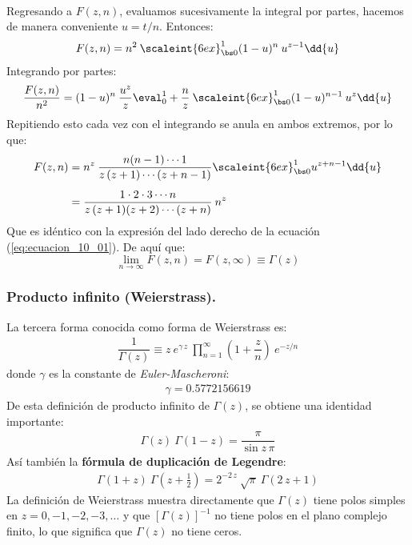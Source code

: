 \\
Regresando a $F(z,n)$, evaluamos sucesivamente la integral por partes, hacemos de manera conveniente $u = t/n$. Entonces:
\begin{align}
F(z,n) = n^{2} \: \scaleint{6ex}_{\bs 0}^{1} (1-u)^{n} \: u^{z-1} \dd{u}
\label{eq:ecuacion_10_12}
\end{align}
Integrando por partes:
\begin{align}
\dfrac{F(z, n)}{n^{2}} =  (1-u)^{n} \: \dfrac{u^{z}}{z} \eval_{0}^{1} + \dfrac{n}{z} \: \scaleint{6ex}_{\bs 0}^{1} (1-u)^{n-1} \: u^{z} \dd{u}
\label{eq:ecuacion_10_13}
\end{align}
Repitiendo esto cada vez con el integrando se anula en ambos extremos, por lo que:
\begin{align}
\begin{aligned}[b]
F(z,n) &= n^{z} \: \dfrac{n(n-1) \cdots 1}{z \, (z+1) \cdots (z+n-1)} \scaleint{6ex}_{\bs 0}^{1} u^{z+n-1} \dd{u} \\[0.5em]
&= \dfrac{1 \cdot 2 \cdot 3 \cdots n}{z \, (z+1)(z+2) \cdots (z+n)} \: n^{z}
\label{eq:ecuacion_10_14}
\end{aligned}
\end{align}
Que es idéntico con la expresión del lado derecho de la ecuación (\ref{eq:ecuacion_10_01}). De aquí que:
\begin{equation}
\lim_{n \to \infty} F(z, n) = F(z, \infty) \equiv \Gamma (z)
\label{eq:ecuacion_10_15}
\end{equation}

\subsubsection{Producto infinito (Weierstrass).}

La tercera forma conocida como forma de Weierstrass es:
\begin{align}
\dfrac{1}{\Gamma (z)} \equiv z \:  e^{\gamma \, z} \: \prod_{n=1}^{\infty} \left( 1 + \dfrac{z}{n} \right) \: e^{-z/n}
\label{eq:ecuacion_10_16}
\end{align}
donde $\gamma$ es la constante de \emph{Euler-Mascheroni}:
\begin{align}
\gamma = 0.5772156619
\label{eq:ecuacion_10_17}
\end{align}
De esta definición de producto infinito de $\Gamma (z)$, se obtiene una identidad importante:
\begin{align}
\Gamma (z) \: \Gamma (1 - z) = \dfrac{\pi}{\sin z \, \pi}
\label{eq:ecuacion_10_23}
\end{align}
Así también la \textbf{fórmula de duplicación de Legendre}:
\begin{align}
\Gamma (1 + z) \: \Gamma (z + \frac{1}{2}) = 2^{-2 \, z} \: \sqrt{\pi} \: \Gamma (2 \, z + 1)
\label{eq:ecuacion_10_24b}
\end{align}
La definición de Weierstrass muestra directamente que $\Gamma (z)$ tiene polos simples en $z = 0, -1, -2, -3, \ldots$ y que $[\Gamma (z)]^{-1}$ no tiene polos en el plano complejo finito, lo que significa que $\Gamma (z)$ no tiene ceros.

